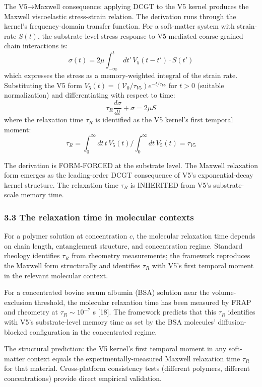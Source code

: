 \documentclass[
  11pt,
  a4paperpaper,
]{article}
\begin{document}
The V5→Maxwell consequence: applying DCGT to the V5 kernel produces the
Maxwell viscoelastic stress-strain relation. The derivation runs through
the kernel's frequency-domain transfer function. For a soft-matter
system with strain-rate \(S(t)\), the substrate-level stress response to
V5-mediated coarse-grained chain interactions is:
\[\sigma(t) = 2\mu \int_{-\infty}^{t} dt' \, V_5(t-t') \cdot S(t')\]
which expresses the stress as a memory-weighted integral of the strain
rate. Substituting the V5 form
\(V_5(t) = (\mathcal{V}_0/\tau_{V5}) e^{-t/\tau_{V5}}\) for \(t > 0\)
(suitable normalization) and differentiating with respect to time:
\[\tau_R \frac{d\sigma}{dt} + \sigma = 2\mu S\] where the relaxation
time \(\tau_R\) is identified as the V5 kernel's first temporal moment:
\[\tau_R = \int_0^\infty dt \, t \, V_5(t) / \int_0^\infty dt \, V_5(t) = \tau_{V5}\]

The derivation is FORM-FORCED at the substrate level. The Maxwell
relaxation form emerges as the leading-order DCGT consequence of V5's
exponential-decay kernel structure. The relaxation time \(\tau_R\) is
INHERITED from V5's substrate-scale memory time.

\subsubsection{3.3 The relaxation time in molecular
contexts}\label{the-relaxation-time-in-molecular-contexts}

For a polymer solution at concentration \(c\), the molecular relaxation
time depends on chain length, entanglement structure, and concentration
regime. Standard rheology identifies \(\tau_R\) from rheometry
measurements; the framework reproduces the Maxwell form structurally and
identifies \(\tau_R\) with V5's first temporal moment in the relevant
molecular context.

For a concentrated bovine serum albumin (BSA) solution near the
volume-exclusion threshold, the molecular relaxation time has been
measured by FRAP and rheometry at \(\tau_R \sim 10^{-7}\) s {[}18{]}.
The framework predicts that this \(\tau_R\) identifies with V5's
substrate-level memory time as set by the BSA molecules'
diffusion-blocked configuration in the concentrated regime.

The structural prediction: the V5 kernel's first temporal moment in any
soft-matter context equals the experimentally-measured Maxwell
relaxation time \(\tau_R\) for that material. Cross-platform consistency
tests (different polymers, different concentrations) provide direct
empirical validation.
\end{document}

